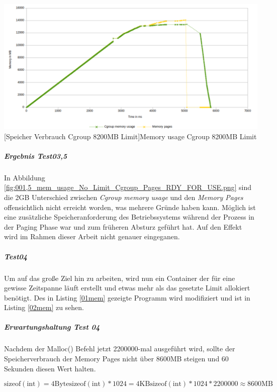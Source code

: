 \vspace{1em}
\begin{minipage}{\linewidth}
	\centering
	\includegraphics[width=1\linewidth]{pics/001,5_mem_usage_No_Limit_Cgroup_Pages_RDY_FOR_USE.png}
	[Speicher Verbrauch Cgroup 8200MB Limit]{Memory usage Cgroup 8200MB Limit}
	\label{fig:001,5_mem_usage_No_Limit_Cgroup_Pages_RDY_FOR_USE.png}
\end{minipage}

\subparagraph{Ergebnis Test03,5}
In Abbildung \ref{fig:001,5_mem_usage_No_Limit_Cgroup_Pages_RDY_FOR_USE.png} sind die 2GB Unterschied zwischen \emph{Cgroup memory usage} und den \emph{Memory Pages} offensichtlich nicht erreicht worden, was mehrere Gründe haben kann. Möglich ist eine zusätzliche Speicheranforderung des Betriebssystems während der Prozess in der Paging Phase war und zum früheren Absturz geführt hat. Auf den Effekt wird im Rahmen dieser Arbeit nicht genauer eingeganen.



\subparagraph{Test04}
Um auf das große Ziel hin zu arbeiten, wird nun ein Container der für eine gewisse Zeitspanne läuft erstellt und etwas mehr als das gesetzte Limit allokiert benötigt. Des in Listing \ref{01mem} gezeigte Programm wird modifiziert und ist in Listing \ref{02mem} zu sehen. 

\vspace{1em}


\subparagraph{Erwartungshaltung Test 04}
Nachdem der Malloc() Befehl jetzt 2200000-mal ausgeführt wird, sollte der Speicherverbrauch der Memory Pages nicht über 8600MB steigen und 60 Sekunden diesen Wert halten.

\[

\mathrm{sizeof(int)} = 4 \mathrm{Byte}

\mathrm{sizeof(int)} * 1024 = 4 \mathrm{KB}

\mathrm{sizeof(int)} * 1024 * 2200000 \approx 8600 \mathrm{MB}\]


